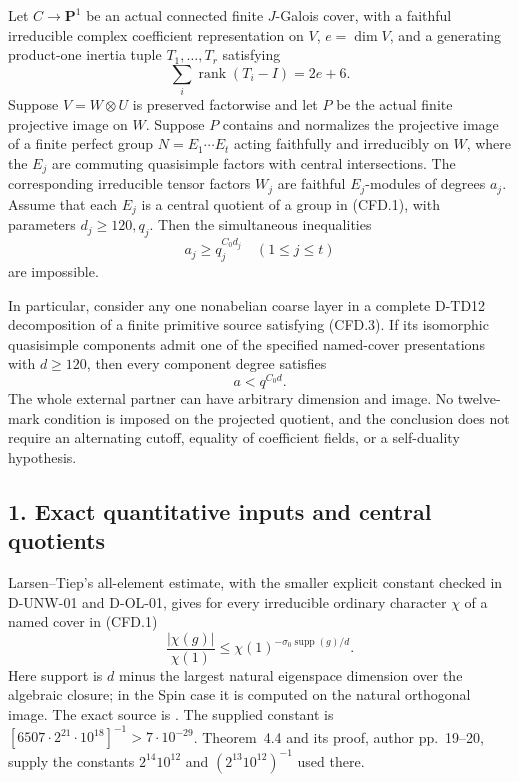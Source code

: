\begin{theorem}[D-TD58]
Let $C\to\mathbf P^1$ be an actual connected finite $J$-Galois
cover, with a faithful irreducible complex coefficient representation
on $V$, $e=\dim V$, and a generating product-one inertia tuple
$T_1,\ldots,T_r$ satisfying
\[
                  \sum_i\operatorname{rank}(T_i-I)=2e+6.
 \tag{CFD.3}
\]
Suppose $V=W\otimes U$ is preserved factorwise and let $P$ be the
actual finite projective image on $W$. Suppose $P$ contains and
normalizes the projective image of a finite perfect group
$N=E_1\cdots E_t$ acting faithfully and irreducibly on $W$, where
the $E_j$ are commuting quasisimple factors with central
intersections. The corresponding irreducible tensor factors $W_j$
are faithful $E_j$-modules of degrees $a_j$. Assume that each $E_j$
is a central quotient of a group in (CFD.1), with parameters
$d_j\ge120,q_j$. Then the simultaneous inequalities
\[
                         a_j\ge q_j^{C_0d_j}
                         \quad(1\le j\le t)
 \tag{CFD.4}
\]
are impossible.

In particular, consider any one nonabelian coarse layer in a complete
D-TD12 decomposition of a finite primitive source satisfying
(CFD.3). If its isomorphic quasisimple components admit one of the
specified named-cover presentations with $d\ge120$, then every
component degree satisfies
\[
                              a<q^{C_0d}.
 \tag{CFD.5}
\]
The whole external partner can have arbitrary dimension and image.
No twelve-mark condition is imposed on the projected quotient,
and the conclusion does not require an alternating cutoff, equality
of coefficient fields, or a self-duality hypothesis.
\end{theorem}

\subsection*{1. Exact quantitative inputs and central quotients}

Larsen--Tiep's all-element estimate, with the smaller explicit
constant checked in D-UNW-01 and D-OL-01, gives for every irreducible
ordinary character $\chi$ of a named cover in (CFD.1)
\[
 \frac{|\chi(g)|}{\chi(1)}
       \le\chi(1)^{-\sigma_0\operatorname{supp}(g)/d}.
 \tag{CFD.6}
\]
Here support is $d$ minus the largest natural eigenspace dimension
over the algebraic closure; in the Spin case it is computed on the
natural orthogonal image. The exact source is
\cite[Theorem~5.5 and complete proof, accepted-author pp.~25--26]
{UNW:LT2024}. The supplied constant is
$[6507\cdot2^{21}\cdot10^{18}]^{-1}>7\cdot10^{-29}$.
Theorem~4.4 and its proof, author pp.~19--20, supply the constants
$2^{14}10^{12}$ and $(2^{13}10^{12})^{-1}$ used there.

